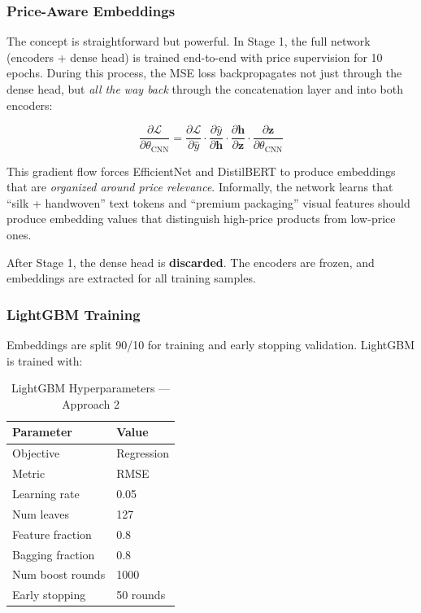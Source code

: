 \documentclass[conference]{IEEEtran}
\begin{document}
\subsubsection{Price-Aware Embeddings}
The concept is straightforward but powerful. In Stage 1, the full network (encoders + dense head) is trained end-to-end with price supervision for 10 epochs. During this process, the MSE loss backpropagates not just through the dense head, but \textit{all the way back} through the concatenation layer and into both encoders:

\begin{equation}
\frac{\partial \mathcal{L}}{\partial \theta_{\text{CNN}}} = \frac{\partial \mathcal{L}}{\partial \hat{y}} \cdot \frac{\partial \hat{y}}{\partial \mathbf{h}} \cdot \frac{\partial \mathbf{h}}{\partial \mathbf{z}} \cdot \frac{\partial \mathbf{z}}{\partial \theta_{\text{CNN}}}
\end{equation}

This gradient flow forces EfficientNet and DistilBERT to produce embeddings that are \textit{organized around price relevance}. Informally, the network learns that ``silk + handwoven'' text tokens and ``premium packaging'' visual features should produce embedding values that distinguish high-price products from low-price ones.

After Stage 1, the dense head is \textbf{discarded}. The encoders are frozen, and embeddings are extracted for all training samples.

\subsubsection{LightGBM Training}
Embeddings are split 90/10 for training and early stopping validation. LightGBM is trained with:

\begin{table}[H]
\centering
\caption{LightGBM Hyperparameters — Approach 2}
\begin{tabular}{ll}
\toprule
Parameter & Value \\
\midrule
Objective & Regression \\
Metric & RMSE \\
Learning rate & 0.05 \\
Num leaves & 127 \\
Feature fraction & 0.8 \\
Bagging fraction & 0.8 \\
Num boost rounds & 1000 \\
Early stopping & 50 rounds \\
\bottomrule
\end{tabular}
\end{table}
\end{document}

